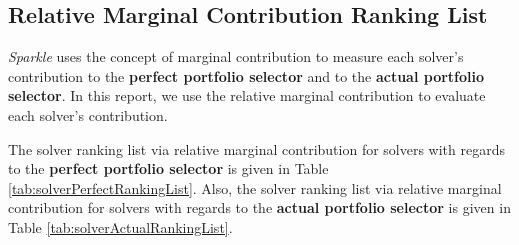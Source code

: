 \documentclass[british]{article}
\begin{document}
\subsection{Relative Marginal Contribution Ranking List}
\label{sec:Relative_Marginal_Contribution_Ranking}

\emph{Sparkle} uses the concept of marginal contribution \cite{XuEtAl12} to measure each solver's contribution to the \textbf{perfect portfolio selector} and to the \textbf{actual portfolio selector}. In this report, we use the relative marginal contribution to evaluate each solver's contribution.

The solver ranking list via relative marginal contribution for solvers with regards to the \textbf{perfect portfolio selector} is given in Table \ref{tab:solverPerfectRankingList}. Also, the solver ranking list via relative marginal contribution for solvers with regards to the \textbf{actual portfolio selector} is given in Table \ref{tab:solverActualRankingList}.
\end{document}
